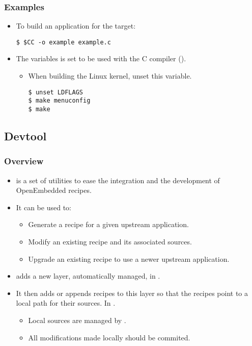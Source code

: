 \begin{frame}[fragile]
  \frametitle{Examples}
  \begin{itemize}
    \item To build an application for the target:
      \begin{block}{}
        \begin{verbatim}
$ $CC -o example example.c
        \end{verbatim}
      \end{block}
    \item The  variables is set to be used with the C
      compiler ().
      \begin{itemize}
        \item When building the Linux kernel, unset this variable.
          \begin{block}{}
            \begin{verbatim}
$ unset LDFLAGS
$ make menuconfig
$ make
            \end{verbatim}
          \end{block}
      \end{itemize}
  \end{itemize}
\end{frame}

\subsection{Devtool}

\begin{frame}
  \frametitle{Overview}
  \begin{itemize}
    \item {} is a set of utilities to ease the integration
    and the development of OpenEmbedded recipes.
    \item It can be used to:
      \begin{itemize}
        \item Generate a recipe for a given upstream application.
        \item Modify an existing recipe and its associated sources.
        \item Upgrade an existing recipe to use a newer upstream
          application.
      \end{itemize}
    \item {} adds a new layer, automatically managed, in
      .
    \item It then adds or appends recipes to this layer so that the
      recipes point to a local path for their sources. In
      .
      \begin{itemize}
        \item Local sources are managed by .
        \item All modifications made locally should be commited.
      \end{itemize}
  \end{itemize}
\end{frame}

